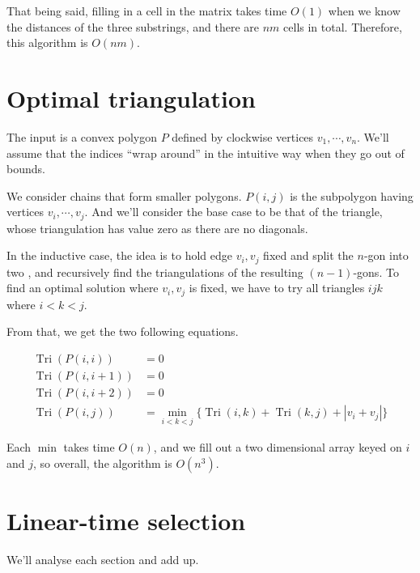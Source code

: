\documentclass{article}
\DeclareMathOperator{\Tri}{Tri}
\begin{document}
That being said, filling in a cell in the matrix takes time $O(1)$ when we know the distances of the three substrings, and there are $nm$ cells in total. Therefore, this algorithm is $O(nm)$.


\section{Optimal triangulation}

The input is a convex polygon $P$ defined by clockwise vertices $v_1, \cdots, v_n$. We'll assume that the indices ``wrap around'' in the intuitive way when they go out of bounds.

We consider chains that form smaller polygons. $P(i,j)$ is the subpolygon having vertices $v_i, \cdots, v_j$. And we'll consider the base case to be that of the triangle, whose triangulation has value zero as there are no diagonals.

In the inductive case, the idea is to hold edge $v_i, v_j$ fixed and split the $n$-gon into two , and recursively find the triangulations of the resulting $(n-1)$-gons. To find an optimal solution where $v_i, v_j$ is fixed, we have to try all triangles $ijk$ where $i < k < j$. 

From that, we get the two following equations.

\begin{align*}
    \Tri{(P(i, i))} &= 0 \\
    \Tri{(P(i, i+1))} &= 0 \\
    \Tri{(P(i, i+2))} &= 0 \\
    \Tri{(P(i, j))} &= \min_{i < k < j} \{\Tri{(i, k)} + \Tri{(k, j)} + |v_i + v_j|\}
\end{align*}

Each $\min$ takes time $O(n)$, and we fill out a two dimensional array keyed on $i$ and $j$, so overall, the algorithm is $O(n^3)$.


\section{Linear-time selection}

We'll analyse each section and add up.
\end{document}
